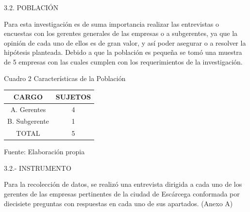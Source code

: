 \documentclass[12pt] {report}
\begin{document}
3.2. POBLACIÓN

Para esta investigación es de suma importancia realizar las entrevistas o encuestas con los gerentes generales de las empresas o a subgerentes, ya que la opinión de cada uno de ellos es de gran valor, y así poder asegurar o a resolver la hipótesis planteada.
Debido a que la población es pequeña se tomó una muestra de 5 empresas con las cuales cumplen con los requerimientos de la investigación.

\begin{center}
Cuadro 2
Características de la Población

\begin{tabular}{|c|c|}
	\hline 
	CARGO & SUJETOS \\ 
	\hline 
	A. Gerentes & 4 \\ 
	\hline 
	B. Subgerente  & 1 \\ 
	\hline 
	TOTAL & 5 \\ 
	\hline 
\end{tabular} 
 
Fuente: Elaboración propia
\end{center}

3.2.- INSTRUMENTO

Para la recolección de datos, se realizó una entrevista dirigida a cada uno de los gerentes de las empresas pertinentes de la ciudad de Escárcega conformada por diecisiete preguntas con respuestas en cada uno de sus apartados. (Anexo A) 
\end{document}
